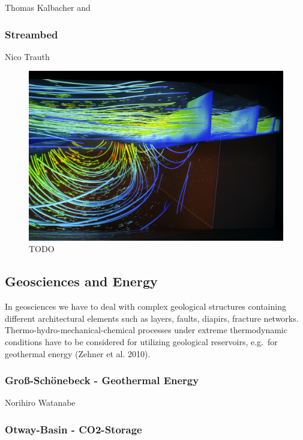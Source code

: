 Thomas Kalbacher \cite{zehner:modelcare} and \cite{rink:modelcare}

\subsubsection{Streambed}\label{streambed}

Nico Trauth

\begin{figure}
  \includegraphics[width=\linewidth]{images/streambed.jpg}
\caption{TODO}
\label{fig:streambed}
\end{figure}

\subsection{Geosciences and Energy}\label{geosciences-and-energy}

In geosciences we have to deal with complex geological structures
containing different architectural elements such as layers, faults,
diapirs, fracture networks. Thermo-hydro-mechanical-chemical processes
under extreme thermodynamic conditions have to be considered for
utilizing geological reservoirs, e.g.~for geothermal energy (Zehner et
al. 2010).

\subsubsection{Gro{\ss}-Sch\"onebeck - Geothermal Energy}
\label{grouxdf-schuxf6nebeck---geothermal-energy}

Norihiro Watanabe

\subsubsection{Otway-Basin - CO2-Storage}
\label{otway-basin---co2-storage}

